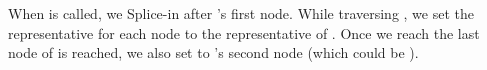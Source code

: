 When  is called, we Splice-in  after 's first
node.  While traversing , we set the representative for each
node to the representative of . Once we reach the last node of
 is reached, we also set  to 's second node
(which could be ).
